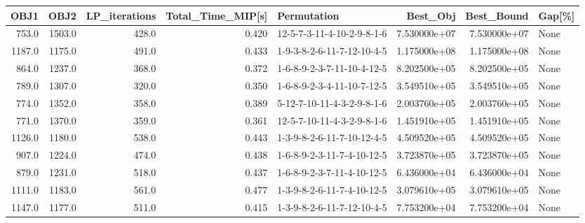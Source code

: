 \begin{tabular}{rrrrlrrl}
\toprule
   OBJ1 &    OBJ2 &  LP\_iterations &  Total\_Time\_MIP[s] &                 Permutation &      Best\_Obj &    Best\_Bound & Gap[\%] \\
\midrule
  753.0 &  1503.0 &          428.0 &              0.420 &  12-5-7-3-11-4-10-2-9-8-1-6 &  7.530000e+07 &  7.530000e+07 &   None \\
 1187.0 &  1175.0 &          491.0 &              0.433 &  1-9-3-8-2-6-11-7-12-10-4-5 &  1.175000e+08 &  1.175000e+08 &   None \\
  864.0 &  1237.0 &          368.0 &              0.372 &  1-6-8-9-2-3-7-11-10-4-12-5 &  8.202500e+05 &  8.202500e+05 &   None \\
  789.0 &  1307.0 &          320.0 &              0.350 &  1-6-8-9-2-3-4-11-10-7-12-5 &  3.549510e+05 &  3.549510e+05 &   None \\
  774.0 &  1352.0 &          358.0 &              0.389 &  5-12-7-10-11-4-3-2-9-8-1-6 &  2.003760e+05 &  2.003760e+05 &   None \\
  771.0 &  1370.0 &          359.0 &              0.361 &  12-5-7-10-11-4-3-2-9-8-1-6 &  1.451910e+05 &  1.451910e+05 &   None \\
 1126.0 &  1180.0 &          538.0 &              0.443 &  1-3-9-8-2-6-11-7-10-12-4-5 &  4.509520e+05 &  4.509520e+05 &   None \\
  907.0 &  1224.0 &          474.0 &              0.438 &  1-6-8-9-2-3-11-7-4-10-12-5 &  3.723870e+05 &  3.723870e+05 &   None \\
  879.0 &  1231.0 &          518.0 &              0.437 &  1-6-8-9-2-3-7-11-4-10-12-5 &  6.436000e+04 &  6.436000e+04 &   None \\
 1111.0 &  1183.0 &          561.0 &              0.477 &  1-3-9-8-2-6-11-7-4-10-12-5 &  3.079610e+05 &  3.079610e+05 &   None \\
 1147.0 &  1177.0 &          511.0 &              0.415 &  1-3-9-8-2-6-11-7-12-10-4-5 &  7.753200e+04 &  7.753200e+04 &   None \\
\bottomrule
\end{tabular}
